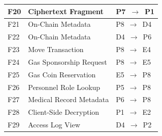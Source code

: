 \begin{table}[H]
\begin{tabular}{|p{}|p{}|p{}|}
		F20         & Ciphertext Fragment          & P7~$\rightarrow$~P1   \\ \hline
		F21         & On-Chain Metadata            & P8~$\rightarrow$~D4   \\ \hline
		F22         & On-Chain Metadata            & D4~$\rightarrow$~P6   \\ \hline
		F23         & Move Transaction             & P8~$\rightarrow$~E4   \\ \hline
		F24         & Gas Sponsorship Request      & P8~$\rightarrow$~E5   \\ \hline
		F25         & Gas Coin Reservation         & E5~$\rightarrow$~P8   \\ \hline
		F26         & Personnel Role Lookup        & P5~$\rightarrow$~P8   \\ \hline
		F27         & Medical Record Metadata      & P6~$\rightarrow$~P8   \\ \hline
		F28         & Client-Side Decryption       & P1~$\rightarrow$~E2   \\ \hline
		F29         & Access Log View              & D4~$\rightarrow$~P2   \\ \hline
	\end{tabular}
\end{table}
